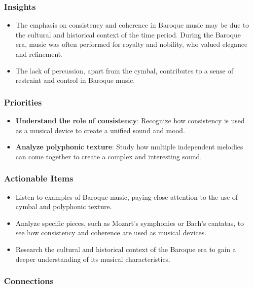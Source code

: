 \documentclass[11pt,letterpaper]{article}
\begin{document}
\subsubsection*{Insights}

\begin{itemize}
  \item The emphasis on consistency and coherence in Baroque music may be due to the cultural and historical context of the time period. During the Baroque era, music was often performed for royalty and nobility, who valued elegance and refinement.
  \item The lack of percussion, apart from the cymbal, contributes to a sense of restraint and control in Baroque music.
\end{itemize}

\subsubsection*{Priorities}

\begin{itemize}
  \item \textbf{Understand the role of consistency}: Recognize how consistency is used as a musical device to create a unified sound and mood.
  \item \textbf{Analyze polyphonic texture}: Study how multiple independent melodies can come together to create a complex and interesting sound.
\end{itemize}

\subsubsection*{Actionable Items}

\begin{itemize}
  \item Listen to examples of Baroque music, paying close attention to the use of cymbal and polyphonic texture.
  \item Analyze specific pieces, such as Mozart's symphonies or Bach's cantatas, to see how consistency and coherence are used as musical devices.
  \item Research the cultural and historical context of the Baroque era to gain a deeper understanding of its musical characteristics.
\end{itemize}

\subsubsection*{Connections}
\end{document}
